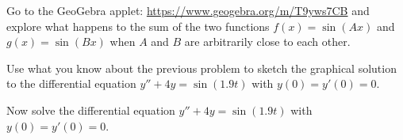 \begin{problem}
    Go to the GeoGebra applet:
    \href{https://www.geogebra.org/m/T9yws7CB}{https://www.geogebra.org/m/T9yws7CB} and
    explore what happens to the sum of the two functions $f(x) = \sin(Ax)$ and $g(x) =
    \sin(Bx)$ when $A$ and $B$ are arbitrarily close to each other.
\end{problem}

\begin{problem}
    Use what you know about the previous problem to sketch the graphical solution to the
    differential equation $y'' + 4y = \sin(1.9t)$ with $y(0) = y'(0) = 0$.
\end{problem}

\begin{problem}
    Now solve the differential equation $y''+4y = \sin(1.9t)$ with $y(0) = y'(0) = 0$.
\end{problem}


